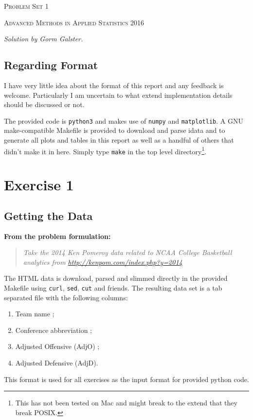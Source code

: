 \documentclass[
    12pt,
    a4paper,
    oneside, 
    headinclude,footinclude,
    BCOR5mm,
]{scrartcl}
\newcommand{\cmd}[1]{\texttt{#1}}
\newcommand{\exercisequote}[1]{%
    {\quad\bfseries \small From the problem formulation:}%
    \vspace{-.5em}%
    \begin{quote}\itshape %
        #1 %
    \end{quote}%
}
\begin{document}
\begin{centering}
    {\scshape \LARGE Problem Set 1 \par}
    {\scshape Advanced Methods in Applied Statistics 2016 \par}
    {\itshape \small Solution by Gorm Galster. \par}
\end{centering}


\subsection*{Regarding Format}
I have very little idea about the format of this report and any feedback is welcome.
Particularly I am uncertain to what extend implementation details should be discussed or not.


The provided code is \cmd{python3} and makes use of \cmd{numpy} and \cmd{matplotlib}.
A GNU make-compatible Makefile is provided to download and parse idata and to generate all plots and tables in this report 
as well as a handful of others that didn't make it in here. Simply type \cmd{make} in the top level directory\footnote{This has not been tested on Mac and might break to the extend that they break POSIX.}.


\section*{Exercise 1}
\subsection*{Getting the Data}
\exercisequote{%
    Take the 2014 Ken Pomeroy data related to NCAA College Basketball analytics %
    from \href{http://kenpom.com/index.php?y=2014}{http://kenpom.com/index.php?y=2014}
}
The HTML data is download, parsed and slimmed directly in the provided Makefile
using \cmd{curl}, \cmd{sed}, \cmd{cut} and friends.
The resulting data set is a tab separated file with the following columns:
\begin{enumerate}
    \item Team name ;
    \item Conference abbreviation ;
    \item Adjusted Offensive (AdjO) ;
    \item Adjusted Defensive (AdjD).
\end{enumerate}
This format is used for all exercises as the input format for provided python code.
\end{document}

